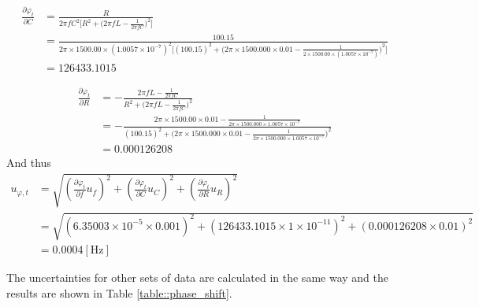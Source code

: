 \documentclass[a4paper]{article}
\begin{document}
\begin{align*}
	\frac{\partial \varphi_t}{\partial C}
	 & = \frac{R}{2\pi fC^2\big[R^2+\big(2\pi fL - \frac{1}{2\pi fC}\big)^2\big]}                                                                                                                   \\
	 & = \frac{100.15}{2\pi \times 1500.00\times (1.0057\times 10^{-7})^2\big[(100.15)^2+\big(2\pi \times 1500.000\times 0.01 - \frac{1}{2\times 1500.00\times (1.0057\times 10^{-7})}\big)^2\big]} \\
	 & = 126433.1015
\end{align*}

\begin{align*}
	\frac{\partial \varphi_t}{\partial R}
	 & = -\frac{2\pi fL-\frac{1}{2\pi fC}}{R^2+\big(2\pi fL-\frac{1}{2\pi fC}\big)^2}                                                                                                                                      \\
	 & = -\frac{2\pi\times 1500.00 \times 0.01-\frac{1}{2\pi \times 1500.000\times 1.0057\times 10^{-7}}}{(100.15)^2+\big(2\pi\times 1500.000\times 0.01-\frac{1}{2\pi \times 1500.000\times 1.0057\times 10^{-7}}\big)^2} \\
	 & = 0.000126208
\end{align*}
And thus
\begin{align*}
	u_{\varphi,t}
	 & = \sqrt{(\frac{\partial \varphi_t}{\partial f}u_f)^2 + (\frac{\partial \varphi_t}{\partial C}u_C)^2 + (\frac{\partial \varphi_t}{\partial R}u_R)^2} \\
	 & = \sqrt{(6.35003\times 10^{-5}\times 0.001)^2 + (126433.1015\times 1\times 10^{-11})^2 + (0.000126208 \times 0.01)^2}                               \\
	 & = 0.0004   [\text{Hz}]
\end{align*}


The uncertainties for other sets of data are calculated in the same way and the results are shown in Table \ref{table::phase_shift}.
\end{document}
